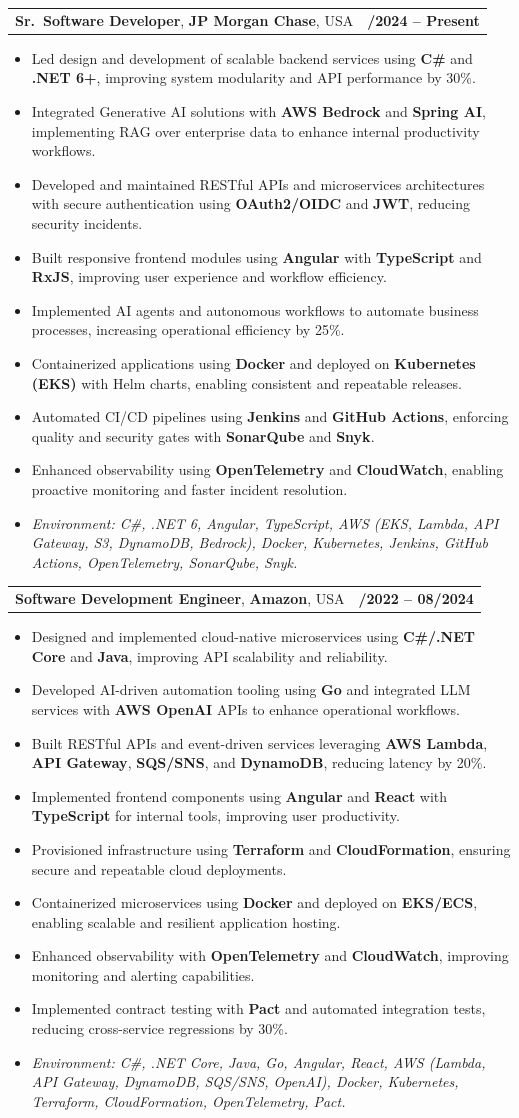 \documentclass[letterpaper,11pt]{article}
\makeatletter
\newcommand{\resumeItem}[1]{
  \item\footnotesize{
    {#1 \vspace{-2pt}}
  }
}
\newcommand{\resumeSubheading}[4]{
  \vspace{-2pt}\item
    \begin{tabular*}{1.0\textwidth}[t]{l@{\extracolsep{\fill}}r}
      \textbf{\fontsize{10pt}{14pt}\selectfont #3}, \textbf{\fontsize{10pt}{14pt}\selectfont #1}, \fontsize{10pt}{14pt}\selectfont #4 & \textbf{\fontsize{10pt}{14pt}\selectfont #2} \\
    \end{tabular*}\vspace{-7pt}
}
\newcommand{\resumeItemListStart}{\begin{itemize}[leftmargin=*]}
\newcommand{\resumeItemListEnd}{\end{itemize}\vspace{-5pt}}
\makeatother
\begin{document}
\resumeSubheading
{JP Morgan Chase}{09/2024 -- Present}
{Sr.\ Software Developer}{USA}
\resumeItemListStart
  \resumeItem{Led design and development of scalable backend services using \textbf{C\#} and \textbf{.NET 6+}, improving system modularity and API performance by 30\%.}
  \resumeItem{Integrated Generative AI solutions with \textbf{AWS Bedrock} and \textbf{Spring AI}, implementing RAG over enterprise data to enhance internal productivity workflows.}
  \resumeItem{Developed and maintained RESTful APIs and microservices architectures with secure authentication using \textbf{OAuth2/OIDC} and \textbf{JWT}, reducing security incidents.}
  \resumeItem{Built responsive frontend modules using \textbf{Angular} with \textbf{TypeScript} and \textbf{RxJS}, improving user experience and workflow efficiency.}
  \resumeItem{Implemented AI agents and autonomous workflows to automate business processes, increasing operational efficiency by 25\%.}
  \resumeItem{Containerized applications using \textbf{Docker} and deployed on \textbf{Kubernetes (EKS)} with Helm charts, enabling consistent and repeatable releases.}
  \resumeItem{Automated CI/CD pipelines using \textbf{Jenkins} and \textbf{GitHub Actions}, enforcing quality and security gates with \textbf{SonarQube} and \textbf{Snyk}.}
  \resumeItem{Enhanced observability using \textbf{OpenTelemetry} and \textbf{CloudWatch}, enabling proactive monitoring and faster incident resolution.}
  \resumeItem{\textit{Environment: C\#, .NET 6, Angular, TypeScript, AWS (EKS, Lambda, API Gateway, S3, DynamoDB, Bedrock), Docker, Kubernetes, Jenkins, GitHub Actions, OpenTelemetry, SonarQube, Snyk.}}
\resumeItemListEnd

\resumeSubheading
{Amazon}{10/2022 -- 08/2024}
{Software Development Engineer}{USA}
\resumeItemListStart
  \resumeItem{Designed and implemented cloud-native microservices using \textbf{C\#/.NET Core} and \textbf{Java}, improving API scalability and reliability.}
  \resumeItem{Developed AI-driven automation tooling using \textbf{Go} and integrated LLM services with \textbf{AWS OpenAI} APIs to enhance operational workflows.}
  \resumeItem{Built RESTful APIs and event-driven services leveraging \textbf{AWS Lambda}, \textbf{API Gateway}, \textbf{SQS/SNS}, and \textbf{DynamoDB}, reducing latency by 20\%.}
  \resumeItem{Implemented frontend components using \textbf{Angular} and \textbf{React} with \textbf{TypeScript} for internal tools, improving user productivity.}
  \resumeItem{Provisioned infrastructure using \textbf{Terraform} and \textbf{CloudFormation}, ensuring secure and repeatable cloud deployments.}
  \resumeItem{Containerized microservices using \textbf{Docker} and deployed on \textbf{EKS/ECS}, enabling scalable and resilient application hosting.}
  \resumeItem{Enhanced observability with \textbf{OpenTelemetry} and \textbf{CloudWatch}, improving monitoring and alerting capabilities.}
  \resumeItem{Implemented contract testing with \textbf{Pact} and automated integration tests, reducing cross-service regressions by 30\%.}
  \resumeItem{\textit{Environment: C\#, .NET Core, Java, Go, Angular, React, AWS (Lambda, API Gateway, DynamoDB, SQS/SNS, OpenAI), Docker, Kubernetes, Terraform, CloudFormation, OpenTelemetry, Pact.}}
\resumeItemListEnd
\end{document}
